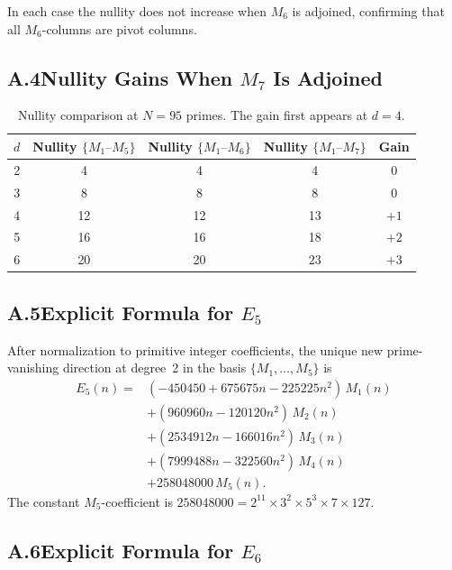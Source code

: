 In each case the nullity does not increase when $M_6$ is adjoined,
confirming that all $M_6$-columns are pivot columns.

\subsection*{A.4\quad Nullity Gains When $M_7$ Is Adjoined}
\label{app:nullity-m7}

\begin{table}[H]
\centering
\caption{Nullity comparison at $N=95$ primes.
         The gain first appears at $d=4$.}
\label{tab:app-nullity-m7}
\begin{tabular}{@{}ccccc@{}}
\toprule
$d$ & Nullity $\{M_1\text{--}M_5\}$ &
      Nullity $\{M_1\text{--}M_6\}$ &
      Nullity $\{M_1\text{--}M_7\}$ & Gain \\
\midrule
2 & 4  & 4  & 4  & 0 \\
3 & 8  & 8  & 8  & 0 \\
4 & 12 & 12 & 13 & $+1$ \\
5 & 16 & 16 & 18 & $+2$ \\
6 & 20 & 20 & 23 & $+3$ \\
\bottomrule
\end{tabular}
\end{table}

\subsection*{A.5\quad Explicit Formula for $E_5$}
\label{app:E5-formula}

After normalization to primitive integer coefficients,
the unique new prime-vanishing direction at degree~2 in the basis
$\{M_1,\dots,M_5\}$ is
\begin{align*}
E_5(n) ={}
  & (-450450+675675n-225225n^2)\,M_1(n) \\
  &+(960960n-120120n^2)\,M_2(n) \\
  &+(2534912n-166016n^2)\,M_3(n) \\
  &+(7999488n-322560n^2)\,M_4(n) \\
  &+258048000\,M_5(n).
\end{align*}
The constant $M_5$-coefficient is
$258048000 = 2^{11}\times 3^2\times 5^3\times 7\times 127$.

\subsection*{A.6\quad Explicit Formula for $E_6$}
\label{app:E6-formula}

